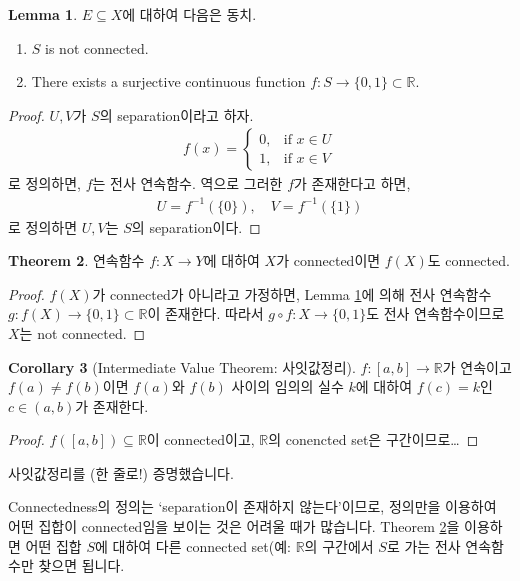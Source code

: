 \documentclass[12pt]{article}
\theoremstyle{definition}
\newtheorem{thm}{Theorem}[section]
\newtheorem{cor}[thm]{Corollary}
\newtheorem{lem}[thm]{Lemma}
\def\RR{\mathbb{R}}
\begin{document}
\begin{lem} \label{lem cont conn}
	\(E \subseteq X\)에 대하여 다음은 동치.
	\begin{enumerate}[label=(\alph*), leftmargin=2\parindent]
		\item
		\(S\) is not connected.
		\item
		There exists a surjective continuous function \(f: S \rightarrow \{0, 1\} \subset \RR\).
	\end{enumerate}
\end{lem}
\begin{proof}
	\(U, V\)가 \(S\)의 separation이라고 하자.
	\begin{gather*}
		f(x)=
		\begin{cases}
			0, &\text{if } x \in U\\
			1, &\text{if } x \in V
		\end{cases}
	\end{gather*}
	로 정의하면, \(f\)는 전사 연속함수. 역으로 그러한 \(f\)가 존재한다고 하면,
	\begin{gather*}
		U = f^{-1}(\{0\}), \quad V = f^{-1}(\{1\})
	\end{gather*}
	로 정의하면 \(U, V\)는 \(S\)의 separation이다.
\end{proof}

\begin{thm} \label{conti conn}
	연속함수 \(f: X \rightarrow Y\)에 대하여 \(X\)가 connected이면 \(f(X)\)도 connected.
\end{thm}
\begin{proof}
	\(f(X)\)가 connected가 아니라고 가정하면, Lemma \ref{lem cont conn}에 의해 전사 연속함수 \(g: f(X) \rightarrow \{0, 1\} \subset \RR\)이 존재한다. 따라서 \(g \circ f: X \rightarrow \{0, 1\}\)도 전사 연속함수이므로 \(X\)는 not connected.
\end{proof}

\begin{cor} [Intermediate Value Theorem: 사잇값정리]
	\(f: [a, b] \rightarrow \RR\)가 연속이고 \(f(a) \neq f(b)\)이면 \(f(a)\)와 \(f(b)\) 사이의 임의의 실수 \(k\)에 대하여 \(f(c) = k\)인 \(c \in (a, b)\)가 존재한다.
\end{cor}
\begin{proof}
	\(f([a, b]) \subseteq \RR\)이 connected이고, \(\RR\)의 conencted set은 구간이므로\ldots
\end{proof}

사잇값정리를 (한 줄로!) 증명했습니다.

Connectedness의 정의는 `separation이 존재하지 않는다'이므로, 정의만을 이용하여 어떤 집합이 connected임을 보이는 것은 어려울 때가 많습니다. Theorem \ref{conti conn}을 이용하면 어떤 집합 \(S\)에 대하여 다른 connected set(예: \(\RR\)의 구간에서 \(S\)로 가는 전사 연속함수만 찾으면 됩니다.
\end{document}
